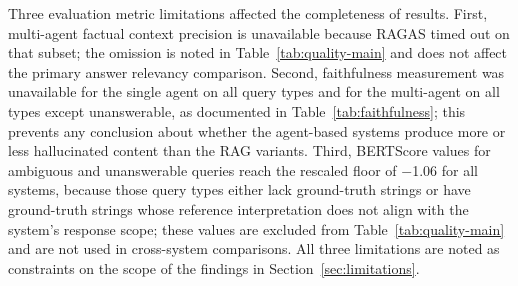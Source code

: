 Three evaluation metric limitations affected the completeness of results. First, multi-agent factual context precision is unavailable because RAGAS timed out on that subset; the omission is noted in Table~\ref{tab:quality-main} and does not affect the primary answer relevancy comparison. Second, faithfulness measurement was unavailable for the single agent on all query types and for the multi-agent on all types except unanswerable, as documented in Table~\ref{tab:faithfulness}; this prevents any conclusion about whether the agent-based systems produce more or less hallucinated content than the RAG variants. Third, BERTScore values for ambiguous and unanswerable queries reach the rescaled floor of $-$1.06 for all systems, because those query types either lack ground-truth strings or have ground-truth strings whose reference interpretation does not align with the system's response scope; these values are excluded from Table~\ref{tab:quality-main} and are not used in cross-system comparisons. All three limitations are noted as constraints on the scope of the findings in Section~\ref{sec:limitations}.
